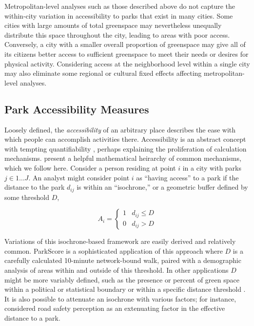 \documentclass[Afour,sageh.bst]{sagej}
\begin{document}
Metropolitan-level analyses such as those described above do not capture
the within-city variation in accessibility to parks that exist in many
cities. Some cities with large amounts of total greenspace may
nevertheless unequally distribute this space throughout the city,
leading to areas with poor access. Conversely, a city with a smaller
overall proportion of greenspace may give all of its citizens better
access to sufficient greenspace to meet their needs or desires for
physical activity. Considering access at the neighborhood level within a
single city may also eliminate some regional or cultural fixed effects
affecting metropolitan-level analyses.

\hypertarget{park-accessibility-measures}{%
\subsection{Park Accessibility
Measures}\label{park-accessibility-measures}}

Loosely defined, the \emph{accessibility} of an arbitrary place
describes the ease with which people can accomplish activities there.
Accessibility is an abstract concept with tempting quantifiability
\citep{Handy1997}, perhaps explaining the proliferation of calculation
mechanisms. \citet{Dong2006} present a helpful mathematical heirarchy of
common mechanisms, which we follow here. Consider a person residing at
point \(i\) in a city with parks \(j \in 1 \ldots J\). An analyst might
consider point \(i\) as ``having access'' to a park if the distance to
the park \(d_{ij}\) is within an ``isochrone,'' or a geometric buffer
defined by some threshold \(D\),

\begin{equation}\label{eq:isochrone}
A_i = \begin{cases} 
      1 & d_{ij}\leq D\\
      0 & d_{ij} > D
   \end{cases}
\end{equation}

Variations of this isochrone-based framework are easily derived and
relatively common. ParkScore \citep{parkscore2019} is a sophisticated
application of this approach where \(D\) is a carefully calculated
10-minute network-bound walk, paired with a demographic analysis of
areas within and outside of this threshold. In other applications \(D\)
might be more variably defined, such as the presence or percent of green
space within a political or statistical boundary
\citep{Mitchell2008, Stark2014} or within a specific distance threshold
\citep{Kaczynski2014}. It is also possible to attenuate an isochrone
with various factors; for instance, \citet{Dias2019} considered road
safety perception as an extenuating factor in the effective distance to
a park.
\end{document}
